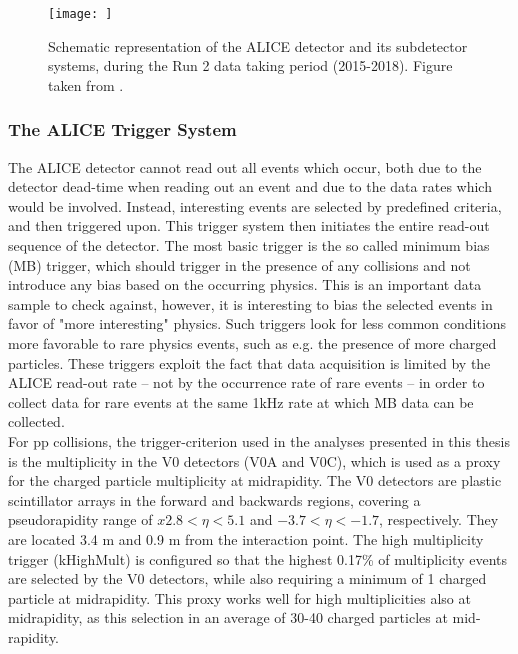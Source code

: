 \begin{figure}
    \centering
    \texttt{[image: ]}
    \caption{Schematic representation of the ALICE detector and its subdetector systems, during the Run 2 data taking period (2015-2018). Figure taken from \cite{}.}
    \label{fig:ALICE}
\end{figure}

\subsubsection{The ALICE Trigger System}
The ALICE detector cannot read out all events which occur, both due to the detector dead-time when reading out an event and due to the data rates which would be involved. Instead, interesting events are selected by predefined criteria, and then triggered upon. This trigger system then initiates the entire read-out sequence of the detector. The most basic trigger is the so called minimum bias (MB) trigger, which should trigger in the presence of any collisions and not introduce any bias based on the occurring physics. This is an important data sample to check against, however, it is interesting to bias the selected events in favor of "more interesting" physics. Such triggers look for less common conditions more favorable to rare physics events, such as e.g. the presence of more charged particles. These triggers exploit the fact that data acquisition is limited by the ALICE read-out rate -- not by the occurrence rate of rare events -- in order to collect data for rare events at the same 1kHz rate at which MB data can be collected. \\

For pp collisions, the trigger-criterion used in the analyses presented in this thesis is the multiplicity in the V0 detectors (V0A and V0C), which is used as a proxy for the charged particle multiplicity at midrapidity. The V0 detectors are plastic scintillator arrays in the forward and backwards regions, covering a pseudorapidity range of $x2.8<\eta<5.1$ and $-3.7<\eta<-1.7$, respectively. They are located 3.4 m and 0.9 m from the interaction point. The high multiplicity trigger (kHighMult) is configured so that the highest 0.17\% of multiplicity events are selected by the V0 detectors, while also requiring a minimum of 1 charged particle at midrapidity. This proxy works well for high multiplicities also at midrapidity, as this selection in an average of 30-40 charged particles at mid-rapidity. 

